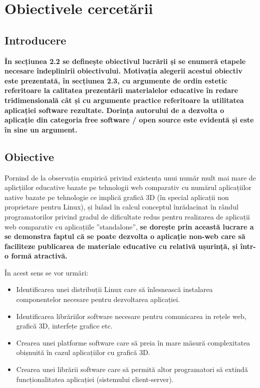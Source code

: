 \chapter{Obiectivele cercetării}
\section{Introducere}
\par \textbf{În secțiunea 2.2 se definește obiectivul lucrării și se enumeră etapele necesare îndeplinirii obiectivului. Motivația alegerii acestui obiectiv este prezentată, în secțiunea 2.3, cu argumente de ordin estetic referitoare la calitatea prezentării materialelor educative în redare tridimensională cât și cu argumente practice referitoare la utilitatea aplicației software rezultate. Dorința autorului de a dezvolta o aplicație din categoria free software / open source este evidentă și este în sine un argument.  }
\section{Obiective}
\par Pornind de la observația empirică privind existența unui număr mult mai mare de aplicțiilor educative bazate pe tehnologii web comparativ cu numărul aplicațiilor native bazate pe tehnologie ce implică grafică 3D (în special aplicații non proprietare pentru Linux), și luând în calcul conceptul înrădacinat în rândul programatorilor privind gradul de dificultate redus pentru realizarea de aplicații web comparativ cu aplicațiile ”standalone”, \textbf{ se dorește prin această lucrare a se demonstra faptul că se poate dezvolta o aplicație non-web care să faciliteze publicarea de materiale educative cu relativă ușurință, și într-o formă atractivă.}
\\
\par În acest sens se vor urmări:
\begin{itemize}
\item Identificarea unei distribuții Linux care să înlesnească instalarea componentelor necesare pentru dezvoltarea aplicației.
\item Identificarea librăriilor software necesare pentru comunicarea in rețele web, grafică 3D, interfețe grafice etc.
\item Crearea unei platforme software care să preia în mare măsură complexitatea obișnuită în cazul aplicațiilor cu grafică 3D.
\item Crearea unei librării software care să permită altor programatori să extindă funcționalitatea aplicației (sistemului client-server).
\end{itemize}

